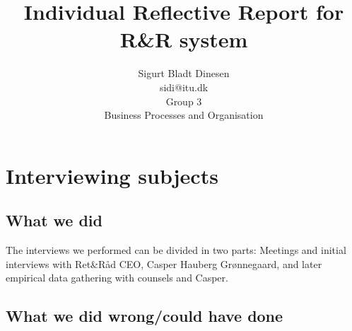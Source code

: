 \documentclass[a4paper, titlepage]{article}
\begin{document}
\title{Individual Reflective Report for R\&R system}
\author{Sigurt Bladt Dinesen\\
sidi{@}itu.dk\\
Group 3\\
Business Processes and Organisation
}

\maketitle

\section{Interviewing subjects}
\subsection{What we did}
The interviews we performed can be divided in two parts: Meetings and initial
interviews with Ret\&Råd CEO, Casper Hauberg Grønnegaard, and later empirical
data gathering with counsels and Casper.

\subsection{What we did wrong/could have done}
\end{document}
